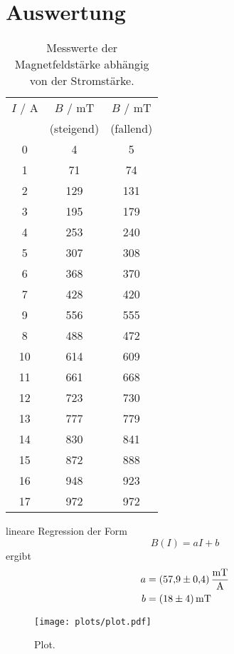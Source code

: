 \section{Auswertung}

\begin{table}
  \centering
  \caption{Messwerte der Magnetfeldstärke abhängig von der Stromstärke.}
  \label{tab:B}
  \begin{tabular}{S[table-format=2] S[table-format=3] S[table-format=3]}
    \toprule
    {$I$ / A} &  {$B$ / mT} & {$B$ / mT} \\
    {} & {(steigend)} & {(fallend)} \\
     &    4 &     5 \\
    1 &   71 &   74 \\
    2 &  129 &  131 \\
    3 &  195 &  179 \\
    4 &  253 &  240 \\
    5 &  307 &  308 \\
    6 &  368 &  370 \\
    7 &  428 &  420 \\
    9 &  556 &  555 \\
    8 &  488 &  472 \\
    10 & 614 &  609 \\
    11 & 661 &  668 \\
    12 & 723 &  730 \\
    13 & 777 &  779 \\
    14 & 830 &  841 \\
    15 & 872 &  888 \\
    16 & 948 &  923 \\
    17 & 972 &  972 \\
    \bottomrule
  \end{tabular}
\end{table}

lineare Regression der Form
\begin{equation}
  B(I) = aI + b
\end{equation}
ergibt
\begin{align*}
  a &= \SI{57.9 \pm 0.4}{\frac{mT}{A}} \\
  b &= \SI{18 \pm 4}{mT}
\end{align*}


\begin{figure}
  \centering
  \texttt{[image: plots/plot.pdf]}
  \caption{Plot.}
  \label{fig:plot}
\end{figure}
